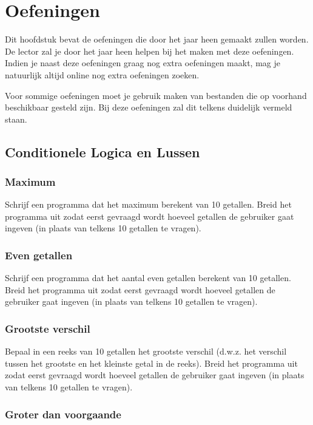 \chapter{Oefeningen}

Dit hoofdstuk bevat de oefeningen die door het jaar heen gemaakt zullen worden. De lector zal je door het jaar heen helpen bij het maken met deze oefeningen. Indien je naast deze oefeningen graag nog extra oefeningen maakt, mag je natuurlijk altijd online nog extra oefeningen zoeken.

Voor sommige oefeningen moet je gebruik maken van bestanden die op voorhand beschikbaar gesteld zijn. Bij deze oefeningen zal dit telkens duidelijk vermeld staan.

\section{Conditionele Logica en Lussen}

\subsection{Maximum}

Schrijf een programma dat het maximum berekent van 10 getallen. Breid het programma uit zodat eerst gevraagd wordt hoeveel getallen de gebruiker gaat ingeven (in plaats van telkens 10 getallen te vragen).

\subsection{Even getallen}

Schrijf een programma dat het aantal even getallen berekent van 10 getallen. Breid het programma uit zodat eerst gevraagd wordt hoeveel getallen de gebruiker gaat ingeven (in plaats van telkens 10 getallen te vragen).

\subsection{Grootste verschil}

Bepaal in een reeks van 10 getallen het grootste verschil (d.w.z. het verschil tussen het grootste en het kleinste getal in de reeks). Breid het programma uit zodat eerst gevraagd wordt hoeveel getallen de gebruiker gaat ingeven (in plaats van telkens 10 getallen te vragen).

\subsection{Groter dan voorgaande}

